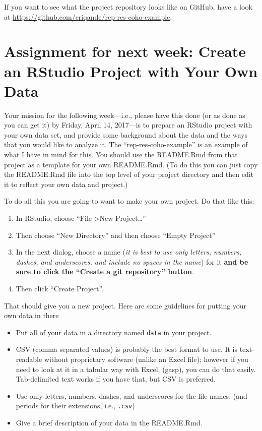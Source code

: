 \documentclass[]{book}
\providecommand{\tightlist}{%
  \setlength{\itemsep}{0pt}\setlength{\parskip}{0pt}}
\theoremstyle{definition}
\theoremstyle{definition}
\theoremstyle{remark}
\begin{document}
If you want to see what the project repository looks like on GitHub,
have a look at \url{https://github.com/eriqande/rep-res-coho-example}.

\section{Assignment for next week: Create an RStudio Project with Your
Own
Data}\label{assignment-for-next-week-create-an-rstudio-project-with-your-own-data}

Your mission for the following week---i.e., please have this done (or as
done as you can get it) by Friday, April 14, 2017---is to prepare an
RStudio project with your own data set, and provide some background
about the data and the ways that you would like to analyze it. The
``rep-res-coho-example'' is an example of what I have in mind for this.
You should use the README.Rmd from that project as a template for your
own README.Rmd. (To do this you can just copy the README.Rmd file into
the top level of your project directory and then edit it to reflect your
own data and project.)

To do all this you are going to want to make your own project. Do that
like this:

\begin{enumerate}
\def\labelenumi{\arabic{enumi}.}
\tightlist
\item
  In RStudio, choose ``File-\textgreater{}New Project\ldots{}''
\item
  Then choose ``New Directory'' and then choose ``Empty Project''
\item
  In the next dialog, choose a name (\emph{it is best to use only
  letters, numbers, dashes, and underscores, and include no spaces in
  the name}) for it \textbf{and be sure to click the ``Create a git
  repository'' button}.\\
\item
  Then click ``Create Project''.
\end{enumerate}

That should give you a new project. Here are some guidelines for putting
your own data in there

\begin{itemize}
\tightlist
\item
  Put all of your data in a directory named \texttt{data} in your
  project.
\item
  CSV (comma separated values) is probably the best format to use. It is
  text-readable without proprietary software (unlike an Excel file);
  however if you need to look at it in a tabular way with Excel, (gasp),
  you can do that easily. Tab-delimited text works if you have that, but
  CSV is preferred.
\item
  Use only letters, numbers, dashes, and underscores for the file names,
  (and periods for their extensions, i.e., \texttt{.csv})
\item
  Give a brief description of your data in the README.Rmd.
\end{itemize}
\end{document}
